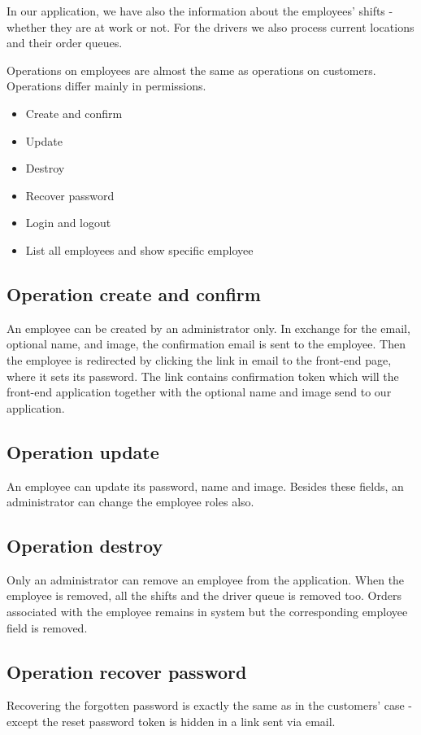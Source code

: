 		In our application, we have also the information about the employees' shifts - whether they are at work or not. For the drivers we also process current locations and their order queues. 
		
		Operations on employees are almost the same as operations on customers. Operations differ mainly in permissions. 
		\begin{itemize}
			\item Create and confirm
			\item Update
			\item Destroy
			\item Recover password
			\item Login and logout
			\item List all employees and show specific employee
		\end{itemize}
			\subsection{Operation create and confirm}
		An employee can be created by an administrator only. In exchange for the email, optional name, and image, the confirmation email is sent to the employee. Then the employee is redirected by clicking the link in email to the front-end page, where it sets its password. The link contains confirmation token which will the front-end application together with the optional name and image send to our application.
		
		\subsection{Operation update}		
		An employee can update its password, name and image. Besides these fields, an administrator can change the employee roles also.
		\subsection{Operation destroy}
		Only an administrator can remove an employee from the application. When the employee is removed, all the shifts and the driver queue is removed too. Orders associated with the employee remains in system but the corresponding employee field is removed.
		\subsection{Operation recover password}
        Recovering the forgotten password is exactly the same as in the customers' case - except the reset password token is hidden in a link sent via email.
